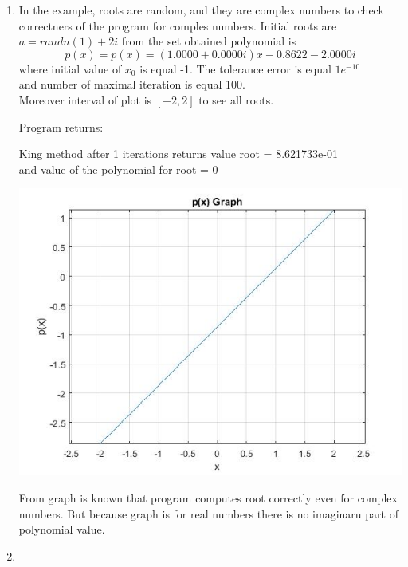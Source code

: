 \documentclass[12pt]{article}
\begin{document}
\begin{enumerate}
\item

In the example, roots are random, and they are complex numbers to check correctners of the program for comples numbers. 
Initial roots are $a=randn(1)+2i$ from the set obtained polynomial is\\
\begin{equation*}p(x)= 
p(x)=   (1.0000 + 0.0000i)x  -0.8622 - 2.0000i
\end{equation*}
where initial value of $x_{0}$ is equal -1.
The tolerance error is equal $1e^{-10}$ \\and number of maximal iteration is equal 100.
\\Moreover interval of plot is $[-2,2]$ to see all roots. 

\vskip20pt

Program returns:
\begin{center}
King method after 1 iterations returns value root = 8.621733e-01\\
and value of the polynomial for root = 0
\end{center}

\begin{center}
   \includegraphics[scale=0.6]{Example_3.jpg}
\end{center}

From graph is known that program computes root correctly even for complex numbers. But because graph is for real numbers there is no imaginaru part of polynomial value.

\item             


\end{enumerate}
\end{document}
